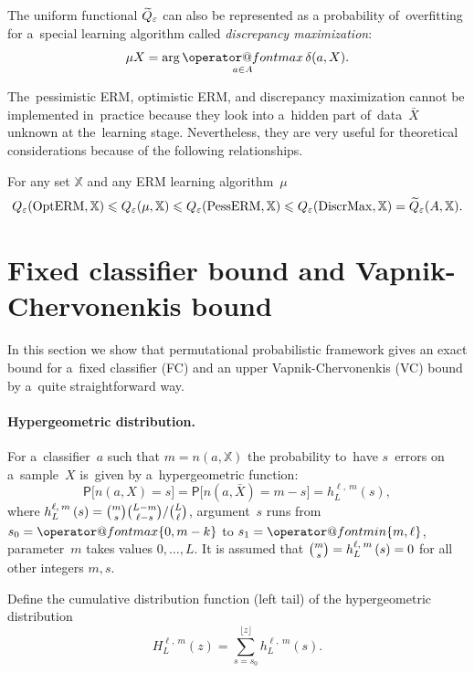 \documentclass{article}
\makeatletter
\def\XX{\mathbb{X}}
\newcommand{\X}{\bar X}
\renewcommand{\leq}{\leqslant}
\renewcommand{\max}{\mathop{\operator@font max}\limits}
\renewcommand{\min}{\mathop{\operator@font min}\limits}
\newcommand{\wtil}{\widetilde}
\def\CC_#1^#2{\tbinom{#1}{#2}}
\providecommand{\Prob}{\mathsf{P}}
\def\Prbig[#1]{\Prob\bigl[#1\bigr]}
\newcommand{\hypergeom}[5]{{#1}_{#2}^{#4,\:#3}\left(#5\right)}
\newcommand{\hyper}[4]{\hypergeom{h}{#1}{#2}{#3}{#4}}
\newcommand{\Hyper}[4]{\hypergeom{H}{#1}{#2}{#3}{#4}}
\renewcommand{\emph}[1]{\textit{#1}}
\makeatother
\begin{document}
The uniform functional $\wtil Q_\eps$ can also be represented as a probability of~overfitting
for a~special learning algorithm called \emph{discrepancy maximization}:
\[
    \mu X = \arg\max_{a\in A} \delta(a,X).
\]

The~pessimistic ERM, optimistic ERM, and discrepancy maximization cannot be implemented in~practice
because they look into a~hidden part of~data~$\X$ unknown at the~learning stage.
Nevertheless, they are very useful for theoretical considerations because of the following relationships.

\begin{lemma}
\label{lem:relationships}
    For any set $\XX$ and any ERM learning algorithm~$\mu$
    \[
        Q_\eps(\mathrm{OptERM}, \XX)
        \leq
        Q_\eps(\mu, \XX)
        \leq
        Q_\eps(\mathrm{PessERM}, \XX)
        \leq
        Q_\eps(\mathrm{DiscrMax}, \XX)
        =
        \wtil Q_\eps(A, \XX).
    \]
\end{lemma}

\section{Fixed classifier bound and Vapnik-Chervonenkis bound}
\label{sec:FC&VC}

In this section we show that permutational probabilistic framework
gives an exact bound for a~fixed classifier (FC) and an upper Vapnik-Chervonenkis (VC) bound
by a~quite straightforward way.

\paragraph{Hypergeometric distribution.}
For a~classifier~$a$ such that $m=n(a,\XX)$
the probability to~have $s$~errors on a~sample~$X$
is~given by a~hypergeometric function:
\[
    \Prbig[ n(a,X)=s ]
    =
    \Prbig[ n(a,\X)=m-s ]
    =
    \hyper{L}{m}{\ell}{s},
\]
where
$\hyper{L}{m}{\ell}{s} = {\CC_m^s \CC_{L-m}^{\ell-s}} / {\CC_L^\ell}$,
argument~$s$ runs from~${s_0 = \max\{0,m-k\}}$ to ${s_1 = \min\{m,\ell\}}$,
parameter~$m$ takes values $0,\ldots,L$.
It is assumed that
$\CC_m^s = \hyper{L}{m}{\ell}{s} = 0$
for all other integers $m,s$.

Define the cumulative distribution function (left tail) of the hypergeometric distribution
\[
    \Hyper{L}{m}{\ell}{z}
    =
    \sum\limits_{s=s_0}^{\lfloor z \rfloor}
    \hyper{L}{m}{\ell}{s}.
\]
\end{document}
